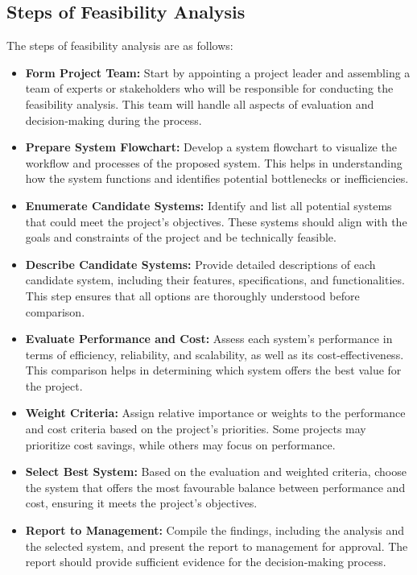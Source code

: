 \documentclass[12pt,a4paper]{article}
\begin{document}
\subsection{Steps of Feasibility Analysis}
The steps of feasibility analysis are as follows:
\begin{itemize}
    \item \textbf{Form Project Team:} Start by appointing a project leader and assembling a team of experts or stakeholders who will be responsible for conducting the feasibility analysis.  This team will handle all aspects of evaluation and decision‑making during the process.
    \item \textbf{Prepare System Flowchart:} Develop a system flowchart to visualize the workflow and processes of the proposed system.  This helps in understanding how the system functions and identifies potential bottlenecks or inefficiencies.
    \item \textbf{Enumerate Candidate Systems:} Identify and list all potential systems that could meet the project’s objectives.  These systems should align with the goals and constraints of the project and be technically feasible.
    \item \textbf{Describe Candidate Systems:} Provide detailed descriptions of each candidate system, including their features, specifications, and functionalities.  This step ensures that all options are thoroughly understood before comparison.
    \item \textbf{Evaluate Performance and Cost:} Assess each system’s performance in terms of efficiency, reliability, and scalability, as well as its cost‑effectiveness.  This comparison helps in determining which system offers the best value for the project.
    \item \textbf{Weight Criteria:} Assign relative importance or weights to the performance and cost criteria based on the project’s priorities.  Some projects may prioritize cost savings, while others may focus on performance.
    \item \textbf{Select Best System:} Based on the evaluation and weighted criteria, choose the system that offers the most favourable balance between performance and cost, ensuring it meets the project’s objectives.
    \item \textbf{Report to Management:} Compile the findings, including the analysis and the selected system, and present the report to management for approval.  The report should provide sufficient evidence for the decision‑making process.
\end{itemize}
\end{document}

